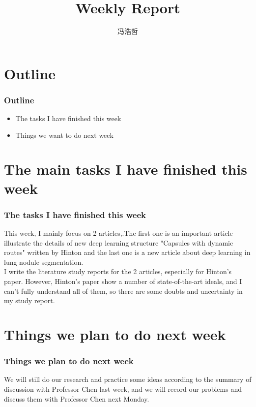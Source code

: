 \documentclass[8pt]{beamer}
\title{Weekly Report}
\author{冯浩哲}
\begin{document}
	\frame{\titlepage}
		
	
	\section*{Outline}	

\begin{frame}[fragile]
\frametitle{Outline}
\begin{itemize}  
	
\item The tasks I have finished this week
\vspace{.5cm} 
\item Things we want to do next week
\vspace{.5cm}
\end{itemize}
\end{frame}

\section*{The main tasks I have finished this week}	
\begin{frame}[fragile]
\frametitle{The tasks I have finished this week}
This week, I mainly focus on 2 articles\cite{46351},\cite{Wang2017}.The first one is an important article illustrate the details of new deep learning structure "Capsules with dynamic routes" written by Hinton and the last one is a new article about deep learning in lung nodule segmentation. \\
\vspace{.5cm}
I write the literature study reports for the 2 articles, especially for Hinton's paper. However, Hinton's paper show a number of state-of-the-art ideals, and I can't fully understand all of them, so there are some doubts and uncertainty in my study report.
\vspace{.3cm}
\end{frame}


\section*{Things we plan to do next week}	
\begin{frame}[fragile]
\frametitle{ Things we plan to do next week}
We will still do our research and practice some ideas according to the summary of  discussion with Professor Chen last week, and we will record our problems and discuss them with Professor Chen next Monday.
\end{frame}



\end{document}
